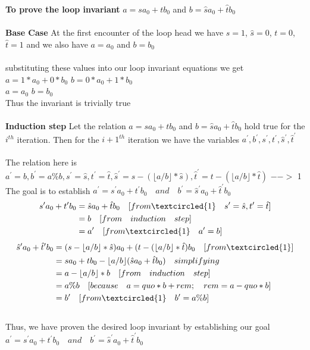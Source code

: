 \documentclass[12pt]{article}
\begin{document}
\textbf{To prove the loop invariant}  \(a=sa_{0}+tb_{0}\) and 
\(b=\hat{s}a_{0}+\hat{t}b_{0}\)
\\ \\
\textbf{Base Case} At the first encounter of the loop head we have \(s=1\),
 \(\hat{s}=0 \), \(t=0\), \(\hat{t}=1\) and we also have \(a=a_{0}\) and \(b=b_{0}\)
\\ \\
substituting these values into our loop invariant equations we get 
\\
 \(a=1*a_{0}+0*b_{0}\)    \qquad       \(b=0*a_{0}+1*b_{0}\)
\\ 
 \(a=a_{0}\)         \qquad        \(b=b_{0}\)
 \\
 Thus the invariant is trivially true
 \\ \\
 \textbf{Induction step} Let the relation \(a=sa_{0}+tb_{0}\) and 
\(b=\hat{s}a_{0}+\hat{t}b_{0}\) hold true for the $i^{th}$ iteration. Then for the \(i+1^{th}\) iteration we have the variables \(a^{\prime}, b^{\prime}, s^{\prime}, t^{\prime}, \hat{s}^{\prime}, \hat{t}^{\prime}\)
\\ \\ 
The relation here is \\ \(a^{\prime}=b, b^{\prime}=a\%b, s^{\prime}=\hat{s}, t^{\prime}=\hat{t}, \hat{s}^{\prime}=s-(\lfloor a/b \rfloor*\hat{s}) , \hat{t}^{\prime}=t-(\lfloor a/b \rfloor*\hat{t}) \) $-->$ \textcircled{1}
\\
The goal is to establish \(a^{\prime}=s^{\prime}a_{0}+t^{\prime}b_{0} \quad and \quad b^{\prime}=\hat{s}^{\prime}a_{0}+\hat{t}^{\prime}b_{0}\)
\\
\begin{equation}
\begin{aligned}
s^{\prime}a_{0}+t^{\prime}b_{0}&=\hat{s}a_{0}+\hat{t}b_{0} \quad [from \textcircled{1} \quad s^{\prime}=\hat{s}, t^{\prime}=\hat{t}] \\
\qquad &=b \quad [from \quad induction \quad step] \nonumber \\
\qquad &=a^{\prime} \quad [from \textcircled{1} \quad a^{\prime}=b]
\end{aligned}
\end{equation}
\begin{equation}
\begin{aligned}
\hat{s}^{\prime}a_{0}+\hat{t}^{\prime}b_{0}&=(s-\lfloor a/b \rfloor*\hat{s})a_{0} + (t-(\lfloor a/b \rfloor*\hat{t})b_{0} \quad [from \textcircled{1}] \\
&=sa_{0} + tb_{0} - \lfloor a/b \rfloor(\hat{s}a_{0}+\hat{t}b_{0}) \quad simplifying \\
&=a-\lfloor a/b \rfloor*b \quad [from \quad induction \quad step] \nonumber \\
&=a\%b \quad [because \quad a=quo*b + rem; \quad rem=a-quo*b] \\
&=b^{\prime} \quad [from \textcircled{1} \quad b^{\prime}=a\%b] 
\end{aligned}
\end{equation} 
\\
Thus, we have proven the desired loop invariant by establishing our goal \(a^{\prime}=s^{\prime}a_{0}+t^{\prime}b_{0} \quad and \quad b^{\prime}=\hat{s}^{\prime}a_{0}+\hat{t}^{\prime}b_{0}\)
\end{document}
